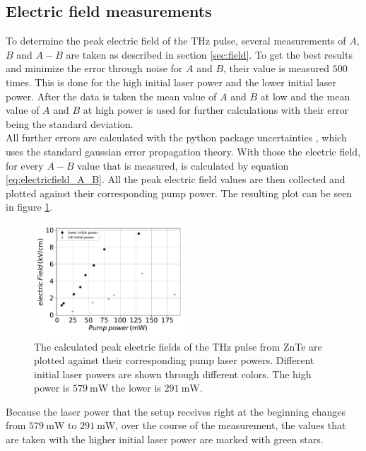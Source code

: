 \subsection{Electric field measurements}
\label{sec:znte_electricfield}
\FloatBarrier
To determine the peak electric field of the $\si{\tera\hertz}$ pulse, several measurements of $A$, $B$ and $A-B$ are taken as described in section \ref{sec:field}.
To get the best results and minimize the error through noise for $A$ and $B$, their value is measured $500$ times.
This is done for the high initial laser power and the lower initial laser power.
After the data is taken the mean value of $A$ and $B$ at low and the mean value of $A$ and $B$ at high power is used for further calculations with their error being the standard deviation.
\\
All further errors are calculated with the python package uncertainties \cite{uncertainties}, which uses the standard gaussian error propagation theory.
With those the electric field, for every $A-B$ value that is measured, is calculated by equation \eqref{eq:electricfield_A_B}.
All the peak electric field values are then collected and plotted against their corresponding pump power.
The resulting plot can be seen in figure \ref{fig:znte_electricfield}.
\\
\begin{figure}
    \centering
    \includegraphics[width=0.5\textwidth]{Plots/eltric_field_ZnTe.pdf}
    \caption{The calculated peak electric fields of the $\si{\tera\hertz}$ pulse from ZnTe are plotted against their corresponding pump laser powers.
    Different initial laser powers are shown through different colors. The high power is $\SI{579}{\milli\W}$ the lower is $\SI{291}{\milli\W}$.}
    \label{fig:znte_electricfield}
\end{figure}
Because the laser power that the setup receives right at the beginning changes from $\SI{579}{\milli\W}$ to $\SI{291}{\milli\W}$, over the course of the measurement, the values that are taken with the higher initial laser power are marked with green stars.
